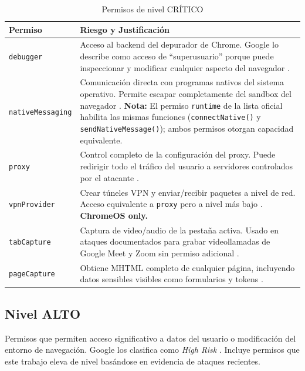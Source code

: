 \documentclass[12pt,oneside]{report}
\begin{document}
\begin{table}[!htbp]
\centering
\small
\begin{tabularx}{\textwidth}{|p{3.5cm}|X|}
\hline
\textbf{Permiso} & \textbf{Riesgo y Justificación} \\
\hline
\texttt{debugger} & Acceso al backend del depurador de Chrome. Google lo describe como acceso de ``superusuario'' porque puede inspeccionar y modificar cualquier aspecto del navegador \cite{google_permission_risk}. \\
\hline
\texttt{nativeMessaging} & Comunicación directa con programas nativos del sistema operativo. Permite escapar completamente del sandbox del navegador \cite{google_permission_risk}. \textbf{Nota:} El permiso \texttt{runtime} de la lista oficial habilita las mismas funciones (\texttt{connectNative()} y \texttt{sendNativeMessage()}); ambos permisos otorgan capacidad equivalente. \\
\hline
\texttt{proxy} & Control completo de la configuración del proxy. Puede redirigir todo el tráfico del usuario a servidores controlados por el atacante \cite{google_permission_risk}. \\
\hline
\texttt{vpnProvider} & Crear túneles VPN y enviar/recibir paquetes a nivel de red. Acceso equivalente a \texttt{proxy} pero a nivel más bajo \cite{google_permission_risk}. \textbf{ChromeOS only.} \\
\hline
\texttt{tabCapture} & Captura de video/audio de la pestaña activa. Usado en ataques documentados para grabar videollamadas de Google Meet y Zoom sin permiso adicional \cite{singh2025study}. \\
\hline
\texttt{pageCapture} & Obtiene MHTML completo de cualquier página, incluyendo datos sensibles visibles como formularios y tokens \cite{google_permission_risk}. \\
\hline
\end{tabularx}
\caption{Permisos de nivel CRÍTICO}
\label{tab:critical_permissions}
\end{table}


\subsection{Nivel ALTO}

Permisos que permiten acceso significativo a datos del usuario o modificación del entorno de navegación. Google los clasifica como \textit{High Risk} \cite{google_permission_risk}. Incluye permisos que este trabajo eleva de nivel basándose en evidencia de ataques recientes.
\end{document}
